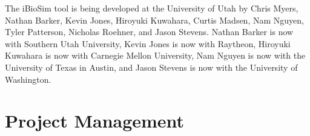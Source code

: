 \documentclass[titlepage,11pt]{article}
\begin{document}
\noindent
The iBioSim tool is being developed at the University of Utah
by 
Chris Myers, 
Nathan Barker, 
Kevin Jones, 
Hiroyuki Kuwahara, 
Curtis Madsen, 
Nam Nguyen, 
Tyler Patterson, 
Nicholas Roehner, 
and Jason Stevens.  Nathan Barker is now with Southern Utah University, Kevin Jones is now with Raytheon, Hiroyuki Kuwahara is now with Carnegie Mellon University, Nam Nguyen is now with the University of Texas in Austin, and Jason Stevens is now with the University of Washington.

\clearpage

\section{Project Management}
\end{document}
